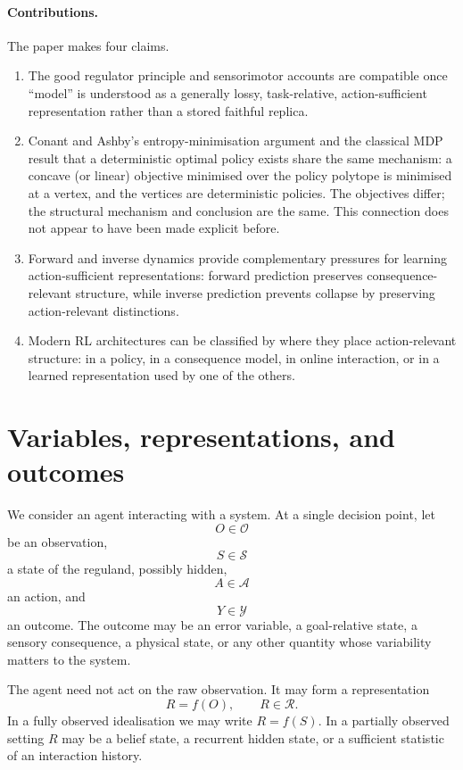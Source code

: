 \documentclass[11pt]{article}
\theoremstyle{remark}
\newcommand{\Acal}{\mathcal A}
\newcommand{\Ocal}{\mathcal O}
\newcommand{\Scal}{\mathcal S}
\newcommand{\Ycal}{\mathcal Y}
\newcommand{\Rcal}{\mathcal R}
\newcommand{\1}{\mathbb 1}
\begin{document}
\paragraph{Contributions.}
The paper makes four claims.
\begin{enumerate}[leftmargin=*]
\item The good regulator principle and sensorimotor accounts are compatible once ``model'' is understood as a generally lossy, task-relative, action-sufficient representation rather than a stored faithful replica.
\item Conant and Ashby's entropy-minimisation argument and the classical MDP result that a deterministic optimal policy exists share the same mechanism: a concave (or linear) objective minimised over the policy polytope is minimised at a vertex, and the vertices are deterministic policies. The objectives differ; the structural mechanism and conclusion are the same. This connection does not appear to have been made explicit before.
\item Forward and inverse dynamics provide complementary pressures for learning action-sufficient representations: forward prediction preserves consequence-relevant structure, while inverse prediction prevents collapse by preserving action-relevant distinctions.
\item Modern RL architectures can be classified by where they place action-relevant structure: in a policy, in a consequence model, in online interaction, or in a learned representation used by one of the others.
\end{enumerate}

\section{Variables, representations, and outcomes}
\label{sec:vars}

We consider an agent interacting with a system. At a single decision point, let
\[
O \in \Ocal
\]
be an observation,
\[
S \in \Scal
\]
a state of the reguland, possibly hidden,
\[
A \in \Acal
\]
an action, and
\[
Y \in \Ycal
\]
an outcome. The outcome may be an error variable, a goal-relative state, a sensory consequence, a physical state, or any other quantity whose variability matters to the system.

The agent need not act on the raw observation. It may form a representation
\[
R = f(O), \qquad R \in \Rcal.
\]
In a fully observed idealisation we may write $R=f(S)$. In a partially observed setting $R$ may be a belief state, a recurrent hidden state, or a sufficient statistic of an interaction history.
\end{document}
